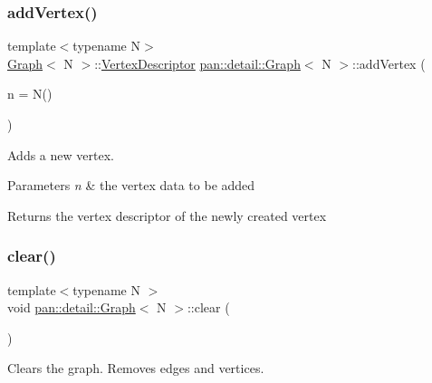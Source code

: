 \subsubsection{\texorpdfstring{add\+Vertex()}{addVertex()}}
{\footnotesize\ttfamily template$<$typename N$>$ \\
\hyperlink{classpan_1_1detail_1_1_graph}{Graph}$<$ N $>$\+::\hyperlink{classpan_1_1detail_1_1_graph_a462f566d2f6cb0e51c85c8e9fa5382ab}{Vertex\+Descriptor} \hyperlink{classpan_1_1detail_1_1_graph}{pan\+::detail\+::\+Graph}$<$ N $>$\+::add\+Vertex (\begin{DoxyParamCaption}\item[{const N \&}]{n = {\ttfamily N()} }\end{DoxyParamCaption})\hspace{0.3cm}{\ttfamily [inline]}}

Adds a new vertex. 
\begin{DoxyParams}{Parameters}
{\em n} & the vertex data to be added \\
\hline
\end{DoxyParams}
\begin{DoxyReturn}{Returns}
the vertex descriptor of the newly created vertex 
\end{DoxyReturn}
\mbox{\label{classpan_1_1detail_1_1_graph_ac24a809b242786e3b5e32fe55227b4e3}} 
\subsubsection{\texorpdfstring{clear()}{clear()}}
{\footnotesize\ttfamily template$<$typename N $>$ \\
void \hyperlink{classpan_1_1detail_1_1_graph}{pan\+::detail\+::\+Graph}$<$ N $>$\+::clear (\begin{DoxyParamCaption}{ }\end{DoxyParamCaption})}

Clears the graph. Removes edges and vertices. \mbox{\label{classpan_1_1detail_1_1_graph_accd48ccab28236e9f0107beea6ae4119}} 
